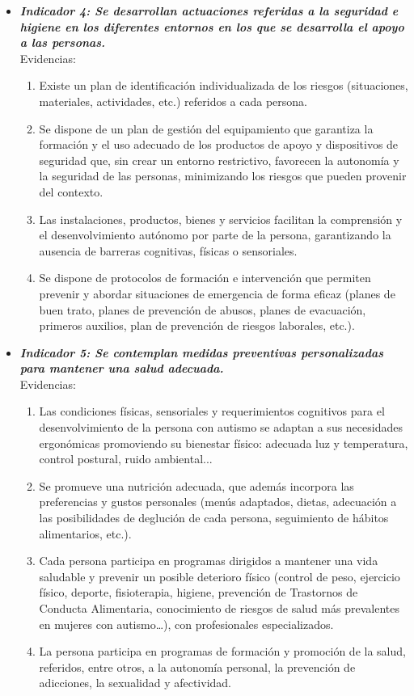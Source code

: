 \begin{itemize}
\begin{itemize}
\begin{itemize}
\begin{itemize}
\begin{enumerate}
				\end{enumerate}
				\item \textbf{\textit{Indicador 4: Se desarrollan actuaciones referidas a la seguridad e higiene en los diferentes entornos en los que se desarrolla el apoyo a las personas.}}\\Evidencias:
				\begin{enumerate}
					\item Existe un plan de identificación individualizada de los riesgos (situaciones, materiales, actividades, etc.) referidos a cada persona.  
					\item Se dispone de un plan de gestión del equipamiento que garantiza la formación y el uso adecuado de los productos de apoyo y dispositivos de seguridad que, sin crear un entorno restrictivo, favorecen la autonomía y la seguridad de las personas, minimizando los riesgos que pueden provenir del contexto. 
					\item Las instalaciones, productos, bienes y servicios facilitan la comprensión y el desenvolvimiento autónomo por parte de la persona, garantizando la ausencia de barreras cognitivas, físicas o sensoriales.  
					\item Se dispone de protocolos de formación e intervención que permiten prevenir y abordar situaciones de emergencia de forma eficaz (planes de buen trato, planes de prevención de abusos, planes de evacuación, primeros auxilios, plan de prevención de riesgos laborales, etc.).      
					 
				\end{enumerate}
				\item \textbf{\textit{Indicador 5: Se contemplan medidas preventivas personalizadas para mantener una salud adecuada.}}\\Evidencias:
				\begin{enumerate}
					\item Las condiciones físicas, sensoriales y requerimientos cognitivos para el desenvolvimiento de la persona con autismo se adaptan a sus necesidades ergonómicas promoviendo su bienestar físico: adecuada luz y temperatura, control postural, ruido ambiental... 
					\item Se promueve una nutrición adecuada, que además incorpora las preferencias y gustos personales (menús adaptados, dietas, adecuación a las posibilidades de deglución de cada persona, seguimiento de hábitos alimentarios, etc.). 
					\item Cada persona participa en programas dirigidos a mantener una vida saludable y prevenir un posible deterioro físico (control de peso, ejercicio físico, deporte, fisioterapia, higiene, prevención de Trastornos de Conducta Alimentaria, conocimiento de riesgos de salud más prevalentes en mujeres con autismo…), con profesionales especializados. 
					\item La persona participa en programas de formación y promoción de la salud, referidos, entre otros, a la autonomía personal, la prevención de adicciones, la sexualidad y afectividad.  
					

\end{enumerate}
\end{itemize}
\end{itemize}
\end{itemize}
\end{itemize}
